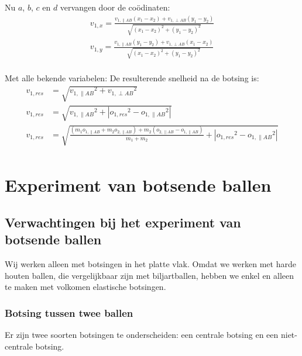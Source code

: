 \documentclass[12pt,a4paper]{article}
\begin{document}
	Nu $a$, $b$, $c$ en $d$ vervangen door de co\"{o}dinaten:
	\begin{equation}
		\begin{aligned}
			v_{1, x}=\frac{v_{1,  \parallel AB}\left(x_1-x_2\right)+v_{1, \perp AB}\left(y_1-y_2\right)}{\sqrt{\left(x_1-x_2\right)^2+\left(y_1-y_2\right)^2}}\\
			v_{1, y}=\frac{v_{1,  \parallel AB}\left(y_1-y_2\right)+v_{1, \perp AB}\left(x_1-x_2\right)}{\sqrt{\left(x_1-x_2\right)^2+\left(y_1-y_2\right)^2}}\\
		\end{aligned}
	\end{equation}
	
	Met alle bekende variabelen:
	De resulterende snelheid na de botsing is: 
	\begin{equation}
		\begin{aligned}
			v_{1, res}&=\sqrt{{v_{1,  \parallel AB}}^2+{v_{1, \perp AB}}^2}\\
			v_{1, res}&=\sqrt{{v_{1,  \parallel AB}}^2+|{o_{1, res}}^2-{o_{1,  \parallel AB}}^2|}\\
			v_{1, res}&=\sqrt{\frac{\left(m_1o_{1,  \parallel AB}+m_2o_{2,  \parallel AB}\right)+m_2\left(o_{2,  \parallel AB}-o_{1,  \parallel AB}\right)}{m_1+m_2}+|{o_{1, res}}^2-{o_{1,  \parallel AB}}^2|}\\
		\end{aligned}
	\end{equation}

	\newpage

	\section{Experiment van botsende ballen}

	\subsection{Verwachtingen bij het experiment van botsende ballen}
	Wij werken alleen met botsingen in het platte vlak. Omdat we werken met harde houten ballen, die vergelijkbaar zijn met biljartballen, hebben we enkel en alleen te maken met volkomen elastische botsingen.

	\subsubsection{Botsing tussen twee ballen}
	Er zijn twee soorten botsingen te onderscheiden: een centrale botsing en een niet-centrale botsing.
\end{document}
